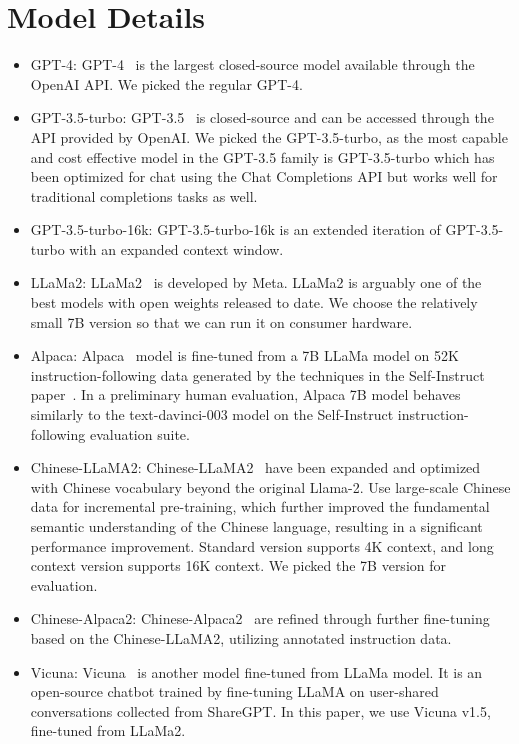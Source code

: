 \section{Model Details}
\label{app: model details}
\begin{itemize}
\item GPT-4: GPT-4~\cite{openai2023gpt4} is the largest closed-source model available through the OpenAI API. We picked the regular GPT-4. 
\item GPT-3.5-turbo: GPT-3.5~\cite{schulman2022chatgpt} is closed-source and can be accessed through the API provided by OpenAI. We picked the GPT-3.5-turbo, as the most capable and cost effective model in the GPT-3.5 family is GPT-3.5-turbo which has been optimized for chat using the Chat Completions API but works well for traditional completions tasks as well.
\item GPT-3.5-turbo-16k: GPT-3.5-turbo-16k is an extended iteration of GPT-3.5-turbo with an expanded context window.
\item LLaMa2: LLaMa2~\cite{touvron2023llama} is developed by Meta. LLaMa2 is arguably one of the best models with open weights released to date. We choose the relatively small 7B version so that we can run it on consumer hardware.
\item Alpaca: Alpaca~\cite{alpaca} model is fine-tuned from a 7B LLaMa model on 52K instruction-following data generated by the techniques in the Self-Instruct paper~\cite{wang2022self}. In a preliminary human evaluation, Alpaca 7B model behaves similarly to the text-davinci-003 model on the Self-Instruct instruction-following evaluation suite.
\item Chinese-LLaMA2: Chinese-LLaMA2~\cite{Chinese-LLaMA-Alpaca} have been expanded and optimized with Chinese vocabulary beyond the original Llama-2. Use large-scale Chinese data for incremental pre-training, which further improved the fundamental semantic understanding of the Chinese language, resulting in a significant performance improvement. Standard version supports 4K context, and long context version supports 16K context. We picked the 7B version for evaluation.
\item Chinese-Alpaca2: Chinese-Alpaca2~\cite{Chinese-LLaMA-Alpaca} are refined through further fine-tuning based on the Chinese-LLaMA2, utilizing annotated instruction data.
\item Vicuna: Vicuna~\cite{chiang2023vicuna} is another model fine-tuned from LLaMa model. It is an open-source chatbot trained by fine-tuning LLaMA on user-shared conversations collected from ShareGPT. In this paper, we use Vicuna v1.5, fine-tuned from LLaMa2.

\end{itemize}
